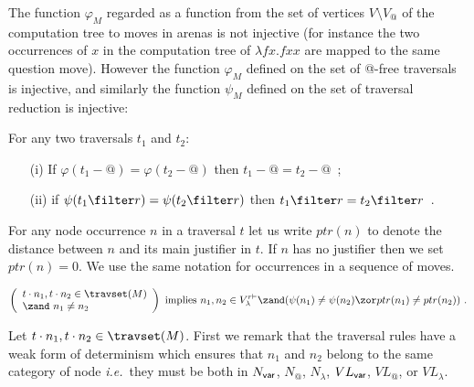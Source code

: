 \bigskip



The function $\varphi_M$ regarded as a function from the set of vertices $V \setminus V_@$ of the computation tree to moves in arenas is not injective (for instance the two occurrences of $x$ in the computation tree of $\lambda f x. f x x$ are mapped to the same question move). However the function $\varphi_M$ defined on the set of @-free traversals is injective, and similarly the function $\psi_M$ defined on the set of traversal reduction is injective:
\begin{lemma}
\label{lem:varphiinjective}
For any two traversals $t_1$ and $t_2$:
\begin{itemize}
\item[(i)] If $\varphi (t_1 - @ ) = \varphi (t_2 - @ )$ then $t_1-@ =t_2 -@$\ ;
\item[(ii)] if $\psi (t_1 \filter r ) = \psi (t_2 \filter r )$ then $t_1\filter r = t_2\filter r$\ .
\end{itemize}
\end{lemma}
For any node occurrence $n$ in a traversal $t$ let us write $ptr(n)$ to denote the distance between $n$ and its main justifier in $t$. If $n$ has no justifier then we set $ptr(n)=0$. We use the same notation for occurrences in a sequence of moves.

\begin{lemma}
\label{lem:varphiinjective:prelem}
\begin{equation*}
\left(
  \begin{array}{ll}
    t \cdot n_1, t \cdot n_2 \in \travset(M) \\
    \zand\ n_1 \neq n_2
  \end{array}
\right)
 \mbox{ implies } n_1,n_2 \in V^{r\vdash}_{\lambda} \zand ( \psi(n_1) \neq \psi(n_2) \zor ptr(n_1) \neq ptr(n_2) ) \ .
 \end{equation*}
\end{lemma}
\proof
Let $t \cdot n_1, t \cdot n_2 \in \travset(M)$. First we remark that
the traversal rules have a weak form of determinism which ensures
that $n_1$ and $n_2$ belong to the same category of node {\it i.e.}\ they
must be both in $N_{\sf var}$, $N_@$, $N_\lambda$, $VL_{\sf var}$,
$VL_@$, or $VL_\lambda$.

